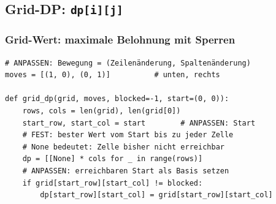 
\subsection{Grid-DP: \texttt{dp[i][j]}}\label{sec:03-grid-dp}

\begin{contentbox}[Musterkarte]
\begin{factlist}
\end{factlist}
\end{contentbox}

\subsubsection{Grid-Wert: maximale Belohnung mit Sperren}\label{sec:03-grid-min-path}

\begin{codeboxfirst}
\begin{lstlisting}[style=CodeExpert]
# ANPASSEN: Bewegung = (Zeilenänderung, Spaltenänderung)
moves = [(1, 0), (0, 1)]          # unten, rechts

def grid_dp(grid, moves, blocked=-1, start=(0, 0)):
    rows, cols = len(grid), len(grid[0])
    start_row, start_col = start        # ANPASSEN: Start
    # FEST: bester Wert vom Start bis zu jeder Zelle
    # None bedeutet: Zelle bisher nicht erreichbar
    dp = [[None] * cols for _ in range(rows)]
    # ANPASSEN: erreichbaren Start als Basis setzen
    if grid[start_row][start_col] != blocked:
        dp[start_row][start_col] = grid[start_row][start_col]
\end{lstlisting}
\end{codeboxfirst}

